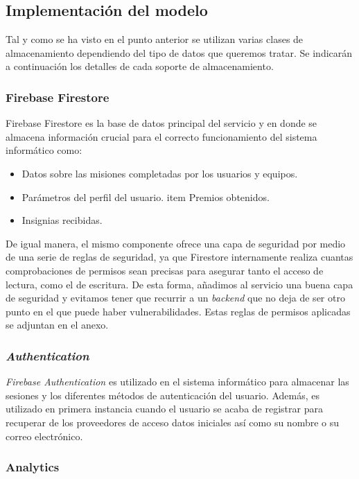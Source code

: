 \documentclass[twoside]{report}
\begin{document}
\subsection{Implementación del modelo}

Tal y como se ha visto en el punto anterior se utilizan varias clases de almacenamiento dependiendo del tipo de datos que queremos tratar. Se indicarán a continuación los detalles de cada soporte de almacenamiento.

\subsubsection{Firebase Firestore}

Firebase Firestore es la base de datos principal del servicio y en donde se almacena información crucial para el correcto funcionamiento del sistema informático como:
\begin{itemize}
\item Datos sobre las misiones completadas por los usuarios y equipos.
\item Parámetros del perfil del usuario.
item Premios obtenidos.
\item Insignias recibidas.
\end{itemize} 

De igual manera, el mismo componente ofrece una capa de seguridad por medio de una serie de reglas de seguridad, ya que Firestore internamente realiza cuantas comprobaciones de permisos sean precisas para asegurar tanto el acceso de lectura, como el de escritura. De esta forma, añadimos al servicio una buena capa de seguridad  y evitamos tener que recurrir a un \textit{backend} que no deja de ser otro punto en el que puede haber vulnerabilidades. Estas reglas de permisos aplicadas se adjuntan en el anexo.

\subsubsection{\textit{Authentication}}

\textit{Firebase Authentication} es utilizado en el sistema informático para almacenar las sesiones y los diferentes métodos de autenticación del usuario. Además, es utilizado en primera instancia cuando el usuario se acaba de registrar para recuperar de los proveedores de acceso datos iniciales así como su nombre o su correo electrónico.

\subsubsection{Analytics}
\end{document}
